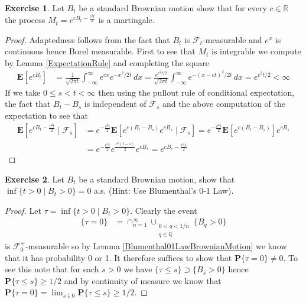 \documentclass{amsbook}
\theoremstyle{definition}
\newtheorem{xca}{Exercise}
\theoremstyle{remark}
\newcommand{\expectation}[1]{\textbf{E}\left[#1\right]}
\newcommand{\cexpectationlong}[2]{\textbf{E}\left[ #2 \mid #1 \right]}
\newcommand{\probability}[1]{\textbf{P}\{#1\}}
\newcommand{\reals}{\mathbb{R}}
\newcommand{\rationals}{\mathbb{Q}}
\begin{document}
\begin{xca}Let $B_t$ be a standard Brownian motion show that for every
  $c \in \reals$ the process $M_t = e^{c B_t - \frac{c^2t}{2}}$ is a martingale.
\end{xca}
\begin{proof}
Adaptedness follows from the fact that $B_t$ is
$\mathcal{F}_t$-measurable and $e^x$ is continuous hence Borel
measurable.  First to see that $M_t$ is integrable we compute by Lemma
\ref{ExpectationRule} and completing the
square
\begin{align*}
\expectation{e^{cB_t}} &= \frac{1}{\sqrt{2\pi t}}
\int_{-\infty}^\infty e^{c x} e^{-x^2/2t} \, dx = \frac{ e^{c^2t/2}}{\sqrt{2\pi t}}
\int_{-\infty}^\infty e^{-(x-ct)^2/2t} \, dx = e^{c^2t/2} < \infty
\end{align*}
If we take $0 \leq s < t < \infty$ then using the pullout rule of
conditional expectation, the fact that $B_t -
B_s$ is independent of $\mathcal{F}_s$ and the above computation of
the expectation to see that
\begin{align*}
\cexpectationlong{\mathcal{F}_s}{e^{c B_t - \frac{c^2t}{2}}}
&=e^{- \frac{c^2t}{2}}\cexpectationlong{\mathcal{F}_s}{e^{c (B_t -B_s)} e^{cB_s} } 
= e^{- \frac{c^2t}{2}}\expectation{e^{c (B_t -B_s)}} e^{cB_s} \\
&= e^{- \frac{c^2t}{2} }e^{\frac{c^2(t-s)}{2}}  e^{cB_s} 
= e^{c B_s - \frac{c^2s}{2}}
\end{align*}
\end{proof}

\begin{xca}Let $B_t$ be a standard Brownian motion, show that $\inf
  \lbrace t > 0 \mid B_t > 0 \rbrace = 0$ a.s.  (Hint: Use
  Blumenthal's 0-1 Law).
\end{xca}
\begin{proof}
Let $\tau = \inf \lbrace t > 0 \mid B_t > 0 \rbrace$.  Clearly the
event 
\begin{align*}
\lbrace \tau = 0 \rbrace &= \cap_{n=1}^\infty \cup_{\substack{0 < q <
    1/n\\ q \in \rationals}} \lbrace B_q > 0 \rbrace
\end{align*}
is  $\mathcal{F}^+_0$-measurable so by Lemma
  \ref{Blumenthal01LawBrownianMotion} we know that it has probability
  0 or 1.  It therefore suffices to show that $\probability { \tau =
    0} \neq 0$.  To see this note that for each $s > 0$ we have
$\lbrace \tau \leq s \rbrace \supset \lbrace B_s > 0 \rbrace$ hence
$\probability{\tau \leq s} \geq 1/2$ and by continuity of measure we
know that $\probability {\tau = 0} = \lim_{s \downarrow 0} \probability{\tau \leq s} \geq 1/2$.
\end{proof}
\end{document}
